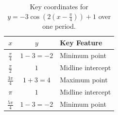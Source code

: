 \documentclass[11pt, a4paper]{article}
\begin{document}
\begin{table}[h]
\centering
\begin{tabular}{c c p{6cm}}
\toprule
$x$ & $y$ & \textbf{Key Feature} \\
\midrule
$\frac{\pi}{4}$ & $1 - 3 = -2$ & Minimum point \\
$\frac{\pi}{2}$ & $1$ & Midline intercept \\
$\frac{3\pi}{4}$ & $1 + 3 = 4$ & Maximum point \\
$\pi$ & $1$ & Midline intercept \\
$\frac{5\pi}{4}$ & $1 - 3 = -2$ & Minimum point \\
\bottomrule
\end{tabular}
\caption{Key coordinates for $y = -3 \cos\left(2\left(x - \frac{\pi}{4}\right)\right) + 1$ over one period.}
\end{table}
\end{document}
